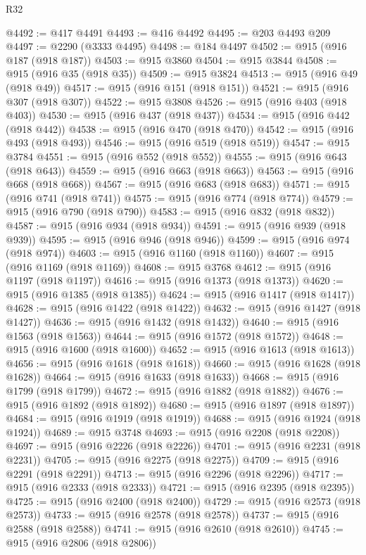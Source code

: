 \begin{lexlean}{R32}
\begin{coremodule}
@4492 := @417 @4491
@4493 := @416 @4492
@4495 := @203 @4493 @209
@4497 := @2290 (@3333 @4495)
@4498 := @184 @4497
@4502 := @915 (@916 @187 (@918 @187))
@4503 := @915 @3860
@4504 := @915 @3844
@4508 := @915 (@916 @35 (@918 @35))
@4509 := @915 @3824
@4513 := @915 (@916 @49 (@918 @49))
@4517 := @915 (@916 @151 (@918 @151))
@4521 := @915 (@916 @307 (@918 @307))
@4522 := @915 @3808
@4526 := @915 (@916 @403 (@918 @403))
@4530 := @915 (@916 @437 (@918 @437))
@4534 := @915 (@916 @442 (@918 @442))
@4538 := @915 (@916 @470 (@918 @470))
@4542 := @915 (@916 @493 (@918 @493))
@4546 := @915 (@916 @519 (@918 @519))
@4547 := @915 @3784
@4551 := @915 (@916 @552 (@918 @552))
@4555 := @915 (@916 @643 (@918 @643))
@4559 := @915 (@916 @663 (@918 @663))
@4563 := @915 (@916 @668 (@918 @668))
@4567 := @915 (@916 @683 (@918 @683))
@4571 := @915 (@916 @741 (@918 @741))
@4575 := @915 (@916 @774 (@918 @774))
@4579 := @915 (@916 @790 (@918 @790))
@4583 := @915 (@916 @832 (@918 @832))
@4587 := @915 (@916 @934 (@918 @934))
@4591 := @915 (@916 @939 (@918 @939))
@4595 := @915 (@916 @946 (@918 @946))
@4599 := @915 (@916 @974 (@918 @974))
@4603 := @915 (@916 @1160 (@918 @1160))
@4607 := @915 (@916 @1169 (@918 @1169))
@4608 := @915 @3768
@4612 := @915 (@916 @1197 (@918 @1197))
@4616 := @915 (@916 @1373 (@918 @1373))
@4620 := @915 (@916 @1385 (@918 @1385))
@4624 := @915 (@916 @1417 (@918 @1417))
@4628 := @915 (@916 @1422 (@918 @1422))
@4632 := @915 (@916 @1427 (@918 @1427))
@4636 := @915 (@916 @1432 (@918 @1432))
@4640 := @915 (@916 @1563 (@918 @1563))
@4644 := @915 (@916 @1572 (@918 @1572))
@4648 := @915 (@916 @1600 (@918 @1600))
@4652 := @915 (@916 @1613 (@918 @1613))
@4656 := @915 (@916 @1618 (@918 @1618))
@4660 := @915 (@916 @1628 (@918 @1628))
@4664 := @915 (@916 @1633 (@918 @1633))
@4668 := @915 (@916 @1799 (@918 @1799))
@4672 := @915 (@916 @1882 (@918 @1882))
@4676 := @915 (@916 @1892 (@918 @1892))
@4680 := @915 (@916 @1897 (@918 @1897))
@4684 := @915 (@916 @1919 (@918 @1919))
@4688 := @915 (@916 @1924 (@918 @1924))
@4689 := @915 @3748
@4693 := @915 (@916 @2208 (@918 @2208))
@4697 := @915 (@916 @2226 (@918 @2226))
@4701 := @915 (@916 @2231 (@918 @2231))
@4705 := @915 (@916 @2275 (@918 @2275))
@4709 := @915 (@916 @2291 (@918 @2291))
@4713 := @915 (@916 @2296 (@918 @2296))
@4717 := @915 (@916 @2333 (@918 @2333))
@4721 := @915 (@916 @2395 (@918 @2395))
@4725 := @915 (@916 @2400 (@918 @2400))
@4729 := @915 (@916 @2573 (@918 @2573))
@4733 := @915 (@916 @2578 (@918 @2578))
@4737 := @915 (@916 @2588 (@918 @2588))
@4741 := @915 (@916 @2610 (@918 @2610))
@4745 := @915 (@916 @2806 (@918 @2806))

\end{coremodule}
\end{lexlean}
